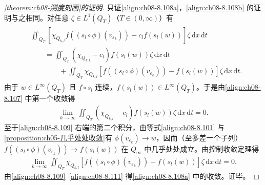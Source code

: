 \documentclass[../../main.tex]{subfiles}%
\begin{document}
\begin{proof}[\cref{theorem:ch08-测度刻画}的证明]
只证\eqref{align:ch08-8.108a}，\eqref{align:ch08-8.108b} 的证明与之相同。对任意 $\zeta\in L^1(Q_T)$（$T\in(0,\infty)$）有
\begin{align}
\begin{aligned}
&\iint_{Q_T}[\chi_{Q_{k,l}}f((s_l\circ\phi)(v_{\varepsilon_k}))-c_l f(s_l(w))]\zeta\,\mathrm{d}x\,\mathrm{d}t\\
&\qquad=\iint_{Q_T}(\chi_{Q_{k,l}}-c_l)f(s_l(w))\zeta\,\mathrm{d}x\,\mathrm{d}t\\
&\qquad\qquad+\iint_{Q_T}\chi_{Q_{k,l}}[f((s_l\circ\phi)(v_{\varepsilon_k}))-f(s_l(w))]\zeta\,\mathrm{d}x\,\mathrm{d}t.
\end{aligned} 
\label{align:ch08-8.109}
\end{align}
由于 $w\in L^\infty(Q_T)$ 且 $f\circ s_l$ 连续，$f(s_l(w))\in L^\infty(Q_T)$。于是由\eqref{align:ch08-8.107} 中第一个收敛得
\begin{align}
\lim_{k\to\infty}\iint_{Q_T}(\chi_{Q_{k,l}}-c_l)f(s_l(w))\zeta\,\mathrm{d}x\,\mathrm{d}t=0. \label{align:ch08-8.110}
\end{align}
至于\eqref{align:ch08-8.109} 右端的第二个积分，由等式\eqref{align:ch08-8.101} 与\cref{proposition:ch05-几乎处处收敛}有 $\phi(v_{\varepsilon_k})\to w$，因而（至多差一个子列）$f((s_l\circ\phi)(v_{\varepsilon_k}))\to f(s_l(w))$ 在 $Q_\infty$ 中几乎处处成立。由控制收敛定理得
\begin{align}
\lim_{k\to\infty}\iint_{Q_T}\chi_{Q_{k,l}}[f((s_l\circ\phi)(v_{\varepsilon_k}))-f(s_l(w))]\zeta\,\mathrm{d}x\,\mathrm{d}t=0. \label{align:ch08-8.111}
\end{align}
由\eqref{align:ch08-8.109}--\eqref{align:ch08-8.111} 得\eqref{align:ch08-8.108a} 中的收敛。证毕。
\end{proof}
\end{document}
